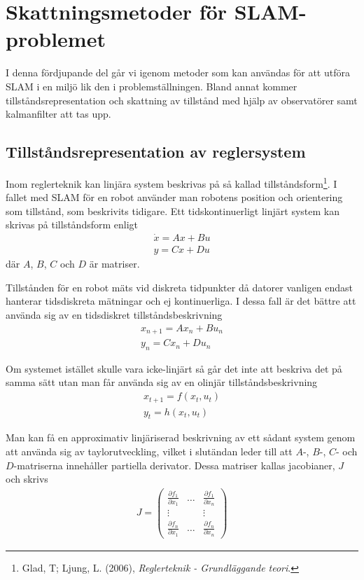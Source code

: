 \documentclass[a4paper,12pt,fleqn]{article}
\begin{document}
\newpage
\section{Skattningsmetoder för SLAM-problemet}
I denna fördjupande del går vi igenom metoder som kan användas för att utföra SLAM i en miljö lik den i problemställningen. Bland annat kommer tillståndsrepresentation och skattning av tillstånd med hjälp av observatörer samt kalmanfilter att tas upp.


\subsection{Tillståndsrepresentation av reglersystem}

Inom reglerteknik kan linjära system beskrivas på så kallad tillståndsform\footnote{Glad, T; Ljung, L. (2006), \textit{Reglerteknik - Grundläggande teori}.}. I fallet med SLAM för en robot använder man robotens position och orientering som tillstånd, som beskrivits tidigare. Ett tidskontinuerligt linjärt system kan skrivas på tillståndsform enligt
\begin{gather}
\dot{x}=Ax+Bu \\
y=Cx+Du	
\label{equ:tillstand}
\end{gather}
där $A$, $B$, $C$ och $D$ är matriser.

Tillstånden för en robot mäts vid diskreta tidpunkter då datorer vanligen endast hanterar tidsdiskreta mätningar och ej kontinuerliga. I dessa fall är det bättre att använda sig av en tidsdiskret tillståndsbeskrivning
\begin{gather}
x_{n+1} = Ax_n + Bu_n \\
y_n = Cx_n + Du_n
\label{equ:disktillstand}
\end{gather}

Om systemet istället skulle vara icke-linjärt så går det inte att beskriva det på samma sätt utan man får använda sig av en olinjär tillståndsbeskrivning
\begin{gather}
	x_{t+1}=f(x_t,u_t)\\
	y_t=h(x_t,u_t)
\end{gather}

Man kan få en approximativ linjäriserad beskrivning av ett sådant system genom att använda sig av taylorutveckling, vilket i slutändan leder till att $A$-, $B$-, $C$- och $D$-matriserna innehåller partiella derivator. Dessa matriser kallas jacobianer, $J$ och skrivs
\begin{gather}
	J= \begin{pmatrix}
	\frac{\partial f_1}{\partial x_1} & \dots & \frac{\partial f_1}{\partial x_n} \\
	  							\vdots &       & \vdots \\
	  \frac{\partial f_n}{\partial x_1} & \dots & \frac{\partial f_n}{\partial x_n}
	  \end{pmatrix}
	  \label{equ:jacobian}
\end{gather}
\end{document}
